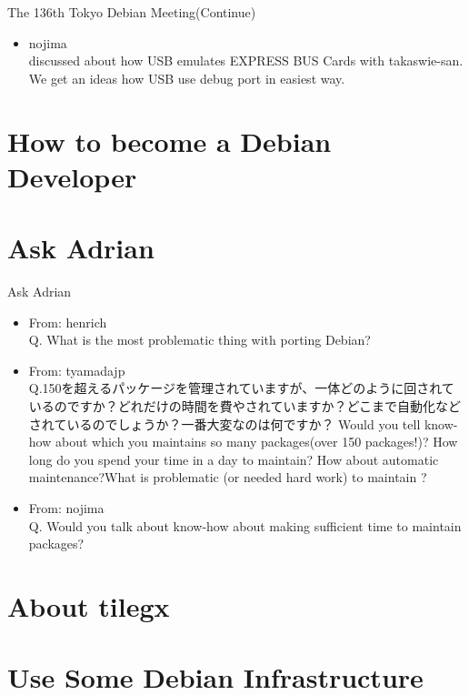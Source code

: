 \begin{frame}{The 136th Tokyo Debian Meeting(Continue)}

\begin{itemize}
\item nojima\\
  discussed about how USB emulates EXPRESS BUS Cards with takaswie-san. We get an ideas how USB use debug port in easiest way.
\end{itemize}

\end{frame}

\section{How to become a Debian Developer}

\section{Ask Adrian}
\begin{frame}{Ask Adrian}

\begin{itemize}
\item From: henrich\\
  Q. What is the most problematic thing with porting Debian?
\item From: tyamadajp\\
  Q.150を超えるパッケージを管理されていますが、一体どのように回されているのですか？どれだけの時間を費やされていますか？どこまで自動化などされているのでしょうか？一番大変なのは何ですか？
  Would you tell know-how about which you maintains so many packages(over 150 packages!)? How long do you spend your time in a day to maintain? How about automatic maintenance?What is  problematic (or needed hard work) to maintain ?
\item From: nojima\\
 Q. Would you talk about know-how about making sufficient time to maintain packages?
\end{itemize}

\end{frame}


\section{About tilegx}

\section{Use Some Debian Infrastructure}

